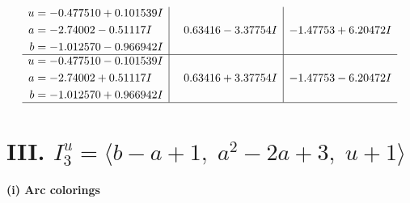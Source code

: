 \documentclass[1p]{elsarticle_modified}
\theoremstyle{definition}
\begin{document}
$$\begin{array}{c|c|c}
\begin{aligned}
u &= -0.477510 + 0.101539 I \\
a &= -2.74002 - 0.51117 I \\
b &= -1.012570 - 0.966942 I\end{aligned}
 & \phantom{-}0.63416 - 3.37754 I & -1.47753 + 6.20472 I \\ \hline\begin{aligned}
u &= -0.477510 - 0.101539 I \\
a &= -2.74002 + 0.51117 I \\
b &= -1.012570 + 0.966942 I\end{aligned}
 & \phantom{-}0.63416 + 3.37754 I & -1.47753 - 6.20472 I\\
 \hline 
 \end{array}$$\newpage\newpage\renewcommand{\arraystretch}{1}
\centering \section*{III. $I^u_{3}= \langle b- a+1,\;a^2-2 a+3,\;u+1 \rangle$}
\flushleft \textbf{(i) Arc colorings}\\
\end{document}
